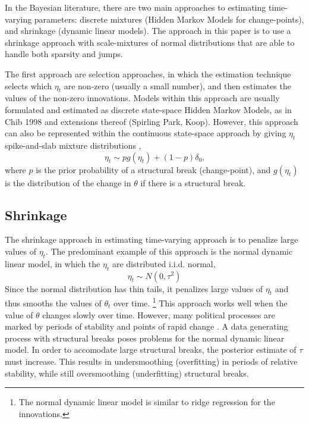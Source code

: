 \documentclass{article}
\begin{document}
In the Bayesian literature, there are two main approaches to estimating time-varying parameters: discrete mixtures (Hidden Markov Models for change-points), and shrinkage (dynamic linear models).
The approach in this paper is to use a shrinkage approach with scale-mixtures of normal distributions that are able to handle both sparsity and jumps.

The first approach are selection approaches, in which the estimation technique selects which $\eta_{t}$ are non-zero (usually a small number), and then estimates the values of the non-zero innovations.
Models within this approach are usually formulated and estimated as discrete state-space Hidden Markov Models, as in Chib 1998 and extensions thereof (Spirling Park, Koop).
However, this approach can also be represented within the continuous state-space approach by giving $\eta_{t}$ spike-and-slab mixture distributions \parencite{GiordaniKohn2008},
\begin{equation}
  \label{eq:1}
  \eta_{t} \sim p g(\eta_{t}) + (1 - p) \delta_{0} \text{,}
\end{equation}
where $p$ is the prior probability of a structural break (change-point), and $g(\eta_{t})$ is the distribution of the change in $\theta$ if there is a structural break.

\subsection{Shrinkage}
\label{sec:shrinkage}

The shrinkage approach in estimating time-varying approach is to penalize large values of $\eta_{t}$. 
The predominant example of this approach is the normal dynamic linear model, in which the $\eta_{t}$ are distributed i.i.d. normal,
\begin{equation}
  \label{eq:4}
  \eta_{t} \sim N(0, \tau^{2})
\end{equation}
Since the normal distribution has thin tails, it penalizes large values of $\eta_{t}$ and thus smooths the values of $\theta_{t}$ over time.
\footnote{The normal dynamic linear model is similar to ridge regression for the innovations.}
This approach works well when the value of $\theta$ changes slowly over time.
However, many political processes are marked by periods of stability and points of rapid change \parencite{RatkovicEng2010}.
A data generating process with structural breaks poses problems for the normal dynamic linear model.
In order to accomodate large structural breaks, the posterior estimate of $\tau$ must increase. 
This results in undersmoothing (overfitting) in periods of relative stability, while still oversmoothing (underfitting) structural breaks.
\end{document}
